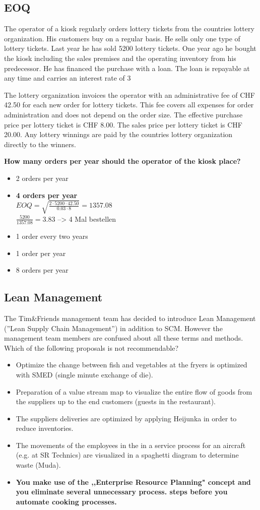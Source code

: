 \subsection{EOQ}
The operator of a kiosk regularly orders lottery tickets from the countries lottery organization. His customers buy on a regular basis. He sells only one type of lottery tickets. Last year he has sold 5200 lottery tickets. One year ago he bought the kiosk including the sales premises and the operating inventory from his predecessor. He has financed the purchase with a loan. The loan is repayable at any time and carries an interest rate of 3%

The lottery organization invoices the operator with an administrative fee of CHF 42.50 for each new order for lottery tickets. This fee covers all expenses for order administration and does not depend on the order size. The effective purchase price per lottery ticket is CHF 8.00. The sales price per lottery ticket is CHF 20.00. Any lottery winnings are paid by the countries lottery organization directly to the winners.

\textbf{How many orders per year should the operator of the kiosk place?}
\begin{itemize}
\item 2 orders per year
\item \textbf{4 orders per year}\\
$EOQ= \sqrt{\frac{2\cdot5200\cdot42.50}{0.03\cdot8}} = 1357.08 $\\
$\frac{5200}{1357.08}=3.83$ --> 4 Mal bestellen
\item 1 order every two years
\item 1 order per year
\item 8 orders per year
\end{itemize}
\subsection{Lean Management}
The Tim\&Friends management team has decided to introduce Lean Management (''Lean Supply Chain Management'') in addition to SCM. However the management team members are confused about all these terms and methods. Which of the following proposals is not recommendable?
\begin{itemize}
\item Optimize the change between fish and vegetables at the fryers is optimized with SMED (single minute exchange of die).
\item Preparation of a value stream map to visualize the entire flow of goods from the suppliers up to the end customers (guests in the restaurant).
\item The suppliers deliveries are optimized by applying Heijunka in order to reduce inventories.
\item The movements of the employees in the in a service process for an aircraft (e.g. at SR Technics) are visualized in a spaghetti diagram to determine waste (Muda).
\item \textbf{You make use of the ,,Enterprise Resource Planning" concept and you eliminate several unnecessary process.
steps before you automate cooking processes.}
\end{itemize}
